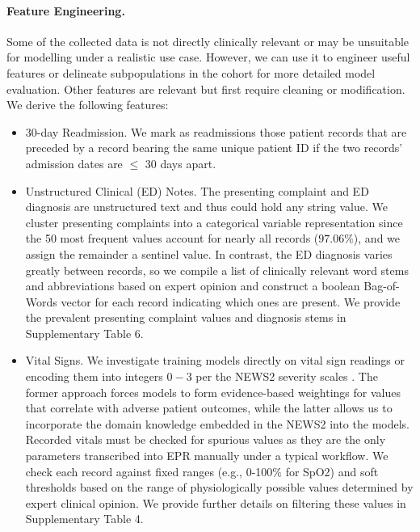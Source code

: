 \documentclass[fleqn,10pt]{wlscirep}
\begin{document}
\paragraph{Feature Engineering.} Some of the collected data is not directly clinically relevant or may be unsuitable for modelling under a realistic use case. However, we can use it to engineer useful features or delineate subpopulations in the cohort for more detailed model evaluation. Other features are relevant but first require cleaning or modification. We derive the following features:
\begin{itemize}
    \item 30-day Readmission. We mark as readmissions those patient records that are preceded by a record bearing the same unique patient ID if the two records’ admission dates are $\leq$ 30 days apart.
    \item Unstructured Clinical (ED) Notes. The presenting complaint and ED diagnosis are unstructured text and thus could hold any string value. We cluster presenting complaints into a categorical variable representation since the 50 most frequent values account for nearly all records ($97.06\%$), and we assign the remainder a sentinel value. In contrast, the ED diagnosis varies greatly between records, so we compile a list of clinically relevant word stems and abbreviations based on expert opinion and construct a boolean Bag-of-Words vector for each record indicating which ones are present. We provide the prevalent presenting complaint values and diagnosis stems in Supplementary Table 6.
    \item Vital Signs. We investigate training models directly on vital sign readings or encoding them into integers $0-3$ per the NEWS2 severity scales \cite{RCP17}. The former approach forces models to form evidence-based weightings for values that correlate with adverse patient outcomes, while the latter allows us to incorporate the domain knowledge embedded in the NEWS2 into the models. Recorded vitals must be checked for spurious values as they are the only parameters transcribed into EPR manually under a typical workflow. We check each record against fixed ranges (e.g., 0-100$\%$ for SpO2) and soft thresholds based on the range of physiologically possible values determined by expert clinical opinion. We provide further details on filtering these values in Supplementary Table 4.
\end{itemize}
\end{document}
